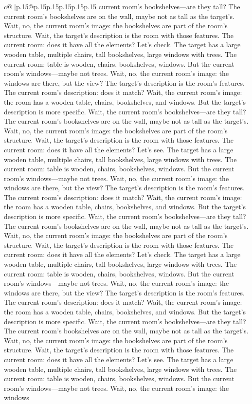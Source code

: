 \documentclass{article}
\begin{document}
{\begin{supertabular}{c@{$\;$}|p{.15\linewidth}@{}p{.15\linewidth}p{.15\linewidth}p{.15\linewidth}p{.15\linewidth}p{.15\linewidth}}
{{{current room's bookshelves—are they tall? The current room's bookshelves are on the wall, maybe not as tall as the target's. Wait, no, the current room's image: the bookshelves are part of the room's structure. Wait, the target's description is the room with those features. The current room: does it have all the elements? Let's check. The target has a large wooden table, multiple chairs, tall bookshelves, large windows with trees. The current room: table is wooden, chairs, bookshelves, windows. But the current room's windows—maybe not trees. Wait, no, the current room's image: the windows are there, but the view? The target's description is the room's features. The current room's description: does it match? Wait, the current room's image: the room has a wooden table, chairs, bookshelves, and windows. But the target's description is more specific. Wait, the current room's bookshelves—are they tall? The current room's bookshelves are on the wall, maybe not as tall as the target's. Wait, no, the current room's image: the bookshelves are part of the room's structure. Wait, the target's description is the room with those features. The current room: does it have all the elements? Let's see. The target has a large wooden table, multiple chairs, tall bookshelves, large windows with trees. The current room: table is wooden, chairs, bookshelves, windows. But the current room's windows—maybe not trees. Wait, no, the current room's image: the windows are there, but the view? The target's description is the room's features. The current room's description: does it match? Wait, the current room's image: the room has a wooden table, chairs, bookshelves, and windows. But the target's description is more specific. Wait, the current room's bookshelves—are they tall? The current room's bookshelves are on the wall, maybe not as tall as the target's. Wait, no, the current room's image: the bookshelves are part of the room's structure. Wait, the target's description is the room with those features. The current room: does it have all the elements? Let's check. The target has a large wooden table, multiple chairs, tall bookshelves, large windows with trees. The current room: table is wooden, chairs, bookshelves, windows. But the current room's windows—maybe not trees. Wait, no, the current room's image: the windows are there, but the view? The target's description is the room's features. The current room's description: does it match? Wait, the current room's image: the room has a wooden table, chairs, bookshelves, and windows. But the target's description is more specific. Wait, the current room's bookshelves—are they tall? The current room's bookshelves are on the wall, maybe not as tall as the target's. Wait, no, the current room's image: the bookshelves are part of the room's structure. Wait, the target's description is the room with those features. The current room: does it have all the elements? Let's see. The target has a large wooden table, multiple chairs, tall bookshelves, large windows with trees. The current room: table is wooden, chairs, bookshelves, windows. But the current room's windows—maybe not trees. Wait, no, the current room's image: the windows }}}
\end{supertabular}}
\end{document}
